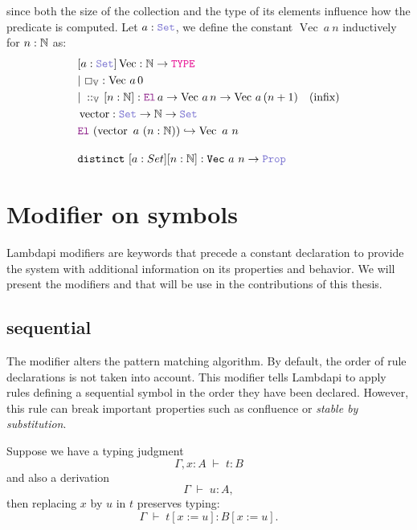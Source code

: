 \begin{definition}\label{def:dependent-vector}
since both the size of the collection and the type of its elements influence how the predicate is computed.
Let \( a : \set \), we define the constant \( \mathop{\mathrm{Vec}}~a~n \) inductively for \( n : \mathbb{N} \) as:
\begin{align*}
&[a: \set] \mathop{\mathrm{Vec}}: \N \ra \type \\
&|~\Box_\bb{V} : \mathop{\mathrm{Vec}}\,a\, 0 \\
&|~\mathbin{::}_\bb{V}\,[n:\N]: \el\,a \ra \mathop{\mathrm{Vec}}\,a\,n \ra  \mathop{\mathrm{Vec}}\,a\,(n +1) \quad (\text{infix})\\
&\mathop{\mathrm{vector}}: \set \ra \N \ra \set \\
&\el~(\mathop{\mathrm{vector}}~a~(n: \N)) \re \mathop{\mathrm{Vec}}~a~n \\[1em]
& \kw{distinct}~[a: Set] [n: \N] : \kw{Vec}~a~n \ra \prop
\end{align*}
\end{definition}

\section{Modifier on symbols}

Lambdapi modifiers are keywords that precede a constant declaration to provide the system with additional information on its properties and behavior.
We will present the modifiers  and  that will be use in the contributions of this thesis.

\subsection{sequential}

The modifier  alters the pattern matching algorithm.
By default, the order of rule declarations is not taken into account.
This modifier tells Lambdapi to apply rules defining a sequential symbol in the order they have been declared.
However, this rule can break important properties such as confluence or \emph{stable by substitution}.

\begin{lemma}\label{lem:stability}
Suppose we have a typing judgment
\[
  \Gamma, x : A \;\vdash\; t : B
\]
and also a derivation
\[
  \Gamma \;\vdash\; u : A ,
\]
then replacing $x$ by $u$ in $t$ preserves typing:
\[
  \Gamma \;\vdash\; t[x := u] : B[x := u] .
\]
\end{lemma}

